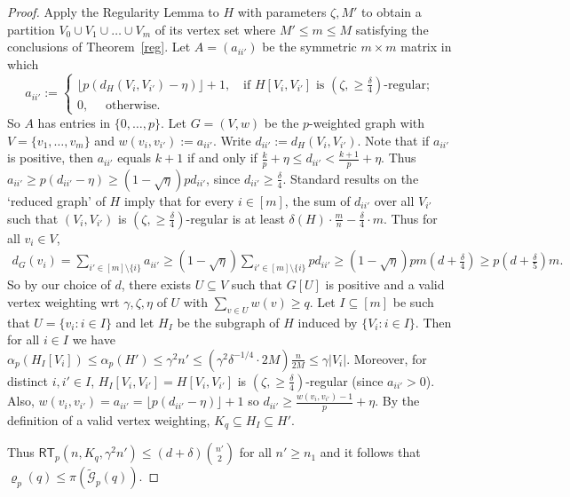 \documentclass[10pt,a4paper]{article}
\theoremstyle{definition}
\def\de{{\delta}}
\newcommand{\cG}{\mathcal{G}}
\newcommand{\rt}{{\mathsf{RT}}}
\begin{document}
\begin{proof}
	Apply the Regularity Lemma to $H$ with parameters $\zeta,M'$
	to obtain a partition $V_0 \cup V_1 \cup \ldots \cup V_m$ of its vertex set where $M' \leq m \leq M$ satisfying the conclusions of Theorem~\ref{reg}.
	Let $A = (a_{ii'})$ be the symmetric $m\times m$ matrix in which
	$$
	a_{ii'} := 
	\begin{cases}
		\lfloor p(d_H(V_i,V_{i'})-\eta)\rfloor+1, \quad\mbox{if } H[V_i,V_{i'}] \text{ is } (\zeta,\geq\!\frac{\delta}{4})\text{-regular};\\
		0, \quad\mbox{ otherwise.} 
	\end{cases}
	$$
	So $A$ has entries in $\{0,\ldots,p\}$.
	Let $G=(V,w)$ be the $p$-weighted graph with $V = \{v_1,\ldots,v_m\}$ and $w(v_i,v_{i'}) := a_{ii'}$.
	Write $d_{ii'} := d_H(V_i,V_{i'})$.
	Note that if $a_{ii'}$ is positive, then $a_{ii'}$ equals $k+1$ if and only if $\frac{k}{p}+\eta \leq d_{ii'} < \frac{k+1}{p}+\eta$.
	Thus $a_{ii'}\geq p(d_{ii'}-\eta) \geq (1-\sqrt{\eta})pd_{ii'}$, since $d_{ii'} \geq \frac{\delta}{4}$.
	Standard results on the `reduced graph' of $H$ imply that for every $i \in [m]$, the sum of $d_{ii'}$ over all $V_{i'}$ such that $(V_i,V_{i'})$ is $(\zeta,\geq\!\frac{\delta}{4})$-regular is at least $\delta(H)\cdot\frac{m}{n}-\frac{\delta}{4}\cdot  m$.
	Thus for all $v_i \in V$,
	\begin{align}\label{eq:gA}
		d_G(v_i) = \sum_{i' \in [m]\setminus\{i\}}a_{ii'} \geq (1-\sqrt{\eta})\sum_{i' \in [m]\setminus\{i\}}pd_{ii'} \geq (1-\sqrt{\eta})pm\left(d+\frac{\delta}{4}\right) \geq p\left(d+\frac{\delta}{5}\right)m.
	\end{align}
	So by our choice of $d$, there exists $U \subseteq V$ such that $G[U]$ is positive and a valid vertex weighting wrt $\gamma,\zeta,\eta$ of $U$ with $\sum_{v \in U}w(v) \geq q$.
	Let $I \subseteq [m]$ be such that $U = \{v_i: i \in I\}$ and let $H_I$ be the subgraph of $H$ induced by $\{V_i: i \in I\}$.
	Then for all $i \in I$ we have $\alpha_p(H_I[V_i])\le \alpha_p(H') \leq \gamma^2 n'\le  (\gamma^2 \de^{-1/4}\cdot 2M)\frac{n}{2M}\leq  \gamma|V_i|$.
	Moreover, for distinct $i,i' \in I$, $H_I[V_i,V_{i'}] = H[V_i,V_{i'}]$ is $(\zeta,\geq\!\frac{\delta}{4})$-regular (since $a_{ii'}>0$).
	Also, $w(v_i,v_{i'})=a_{ii'}=\lfloor p(d_{ii'}-\eta)\rfloor + 1$ so $d_{ii'}\geq \frac{w(v_i,v_{i'})-1}{p}+\eta$.
	By the definition of a valid vertex weighting, $K_q \subseteq H_I\subseteq H'$.
	
	Thus $\rt_p(n,K_q,\gamma^2 n') \leq (d+\delta)\binom{n'}{2}$ for all $n' \geq n_1$ and it follows that $\varrho_p(q) \leq \pi(\widetilde{\cG}_p(q))$.
\end{proof}
\end{document}
